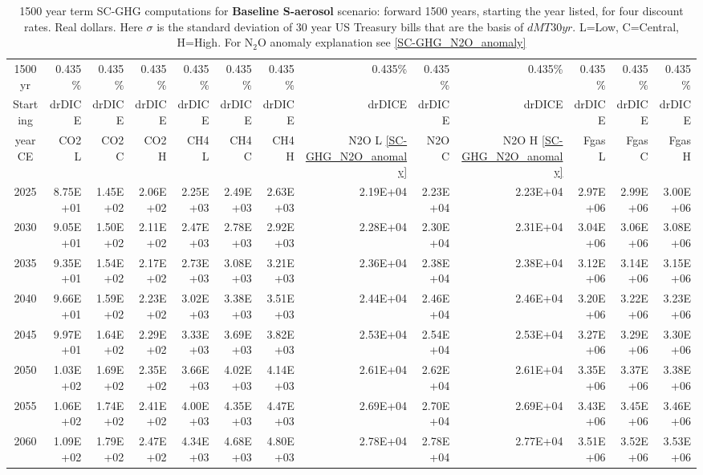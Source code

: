 \documentclass{article}
\begin{document}
\begin{table}
   \caption{1500 year term SC-GHG computations for \textbf{Baseline S-aerosol} scenario:  forward 1500 years, starting the year listed, for four discount rates. Real dollars. Here $\sigma$ is the standard deviation of 30 year US Treasury bills that are the basis of $dMT30yr$. L=Low, C=Central, H=High. For N$_2$O anomaly explanation see \ref{SC-GHG_N2O_anomaly}} 
\label{PVs_1500_yearSCC_BH2}
\small
\begin{tabular}{crrr|rrr|rrr|rrr}
1500 yr  & 0.435\%  & 0.435\%  & 0.435\%  & 0.435\%  & 0.435\%  & 0.435\%  & 0.435\%  & 0.435\%  & 0.435\%  & 0.435\%  & 0.435\%  & 0.435\%  \\
Starting & drDICE   & drDICE   & drDICE   & drDICE   & drDICE   & drDICE   & drDICE   & drDICE   & drDICE   & drDICE   & drDICE   & drDICE   \\
year CE  & CO2 L    & CO2 C    & CO2 H    & CH4 L    & CH4 C    & CH4 H    & N2O L \ref{SC-GHG_N2O_anomaly}     & N2O C      & N2O H \ref{SC-GHG_N2O_anomaly}    & Fgas L   & Fgas C   & Fgas H   \\
2025     & 8.75E+01 & 1.45E+02 & 2.06E+02 & 2.25E+03 & 2.49E+03 & 2.63E+03 & 2.19E+04 & 2.23E+04 & 2.23E+04 & 2.97E+06 & 2.99E+06 & 3.00E+06 \\
2030     & 9.05E+01 & 1.50E+02 & 2.11E+02 & 2.47E+03 & 2.78E+03 & 2.92E+03 & 2.28E+04 & 2.30E+04 & 2.31E+04 & 3.04E+06 & 3.06E+06 & 3.08E+06 \\
2035     & 9.35E+01 & 1.54E+02 & 2.17E+02 & 2.73E+03 & 3.08E+03 & 3.21E+03 & 2.36E+04 & 2.38E+04 & 2.38E+04 & 3.12E+06 & 3.14E+06 & 3.15E+06 \\
2040     & 9.66E+01 & 1.59E+02 & 2.23E+02 & 3.02E+03 & 3.38E+03 & 3.51E+03 & 2.44E+04 & 2.46E+04 & 2.46E+04 & 3.20E+06 & 3.22E+06 & 3.23E+06 \\
2045     & 9.97E+01 & 1.64E+02 & 2.29E+02 & 3.33E+03 & 3.69E+03 & 3.82E+03 & 2.53E+04 & 2.54E+04 & 2.53E+04 & 3.27E+06 & 3.29E+06 & 3.30E+06 \\
2050     & 1.03E+02 & 1.69E+02 & 2.35E+02 & 3.66E+03 & 4.02E+03 & 4.14E+03 & 2.61E+04 & 2.62E+04 & 2.61E+04 & 3.35E+06 & 3.37E+06 & 3.38E+06 \\
2055     & 1.06E+02 & 1.74E+02 & 2.41E+02 & 4.00E+03 & 4.35E+03 & 4.47E+03 & 2.69E+04 & 2.70E+04 & 2.69E+04 & 3.43E+06 & 3.45E+06 & 3.46E+06 \\
2060     & 1.09E+02 & 1.79E+02 & 2.47E+02 & 4.34E+03 & 4.68E+03 & 4.80E+03 & 2.78E+04 & 2.78E+04 & 2.77E+04 & 3.51E+06 & 3.52E+06 & 3.53E+06 \\

\end{tabular}
\end{table}
\end{document}
